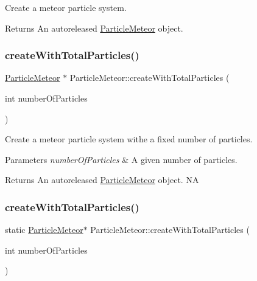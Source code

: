Create a meteor particle system.

\begin{DoxyReturn}{Returns}
An autoreleased \hyperlink{classParticleMeteor}{Particle\+Meteor} object. 
\end{DoxyReturn}
\mbox{\label{classParticleMeteor_a3b474d5d8027cb1c65de7f3b8c466b9b}} 
\subsubsection{\texorpdfstring{create\+With\+Total\+Particles()}{createWithTotalParticles()}\hspace{0.1cm}{\footnotesize\ttfamily [1/2]}}
{\footnotesize\ttfamily \hyperlink{classParticleMeteor}{Particle\+Meteor} $\ast$ Particle\+Meteor\+::create\+With\+Total\+Particles (\begin{DoxyParamCaption}\item[{int}]{number\+Of\+Particles }\end{DoxyParamCaption})\hspace{0.3cm}{\ttfamily [static]}}

Create a meteor particle system withe a fixed number of particles.


\begin{DoxyParams}{Parameters}
{\em number\+Of\+Particles} & A given number of particles. \\
\hline
\end{DoxyParams}
\begin{DoxyReturn}{Returns}
An autoreleased \hyperlink{classParticleMeteor}{Particle\+Meteor} object.  NA 
\end{DoxyReturn}
\mbox{\label{classParticleMeteor_a3a597e14cddb1dd2977c6fbf3652684a}} 
\subsubsection{\texorpdfstring{create\+With\+Total\+Particles()}{createWithTotalParticles()}\hspace{0.1cm}{\footnotesize\ttfamily [2/2]}}
{\footnotesize\ttfamily static \hyperlink{classParticleMeteor}{Particle\+Meteor}$\ast$ Particle\+Meteor\+::create\+With\+Total\+Particles (\begin{DoxyParamCaption}\item[{int}]{number\+Of\+Particles }\end{DoxyParamCaption})\hspace{0.3cm}{\ttfamily [static]}}

